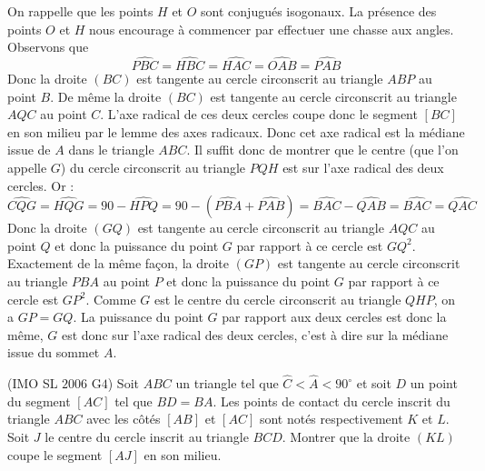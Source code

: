 \begin{sol}
On rappelle que les points $H$ et $O$ sont conjugués isogonaux. La présence des points $O$ et $H$ nous encourage à commencer par effectuer une chasse aux angles. Observons que
$$\widehat{PBC}=\widehat{HBC}=\widehat{HAC}=\widehat{OAB}=\widehat{PAB}$$ Donc la droite $(BC)$ est tangente au cercle circonscrit au triangle $ABP$ au point $B$. De même la droite $(BC)$ est tangente au cercle circonscrit au triangle $AQC$ au point $C$. L'axe radical de ces deux cercles coupe donc le segment $[BC]$ en son milieu par le lemme des axes radicaux. Donc cet axe radical est la médiane issue de $A$ dans le triangle $ABC$. Il suffit donc de montrer que le centre (que l'on appelle $G$) du cercle circonscrit au triangle $PQH$ est sur l'axe radical des deux cercles. Or :
$$\widehat{CQG}=\widehat{HQG}=90-\widehat{HPQ}=90-(\widehat{PBA}+\widehat{PAB})=\widehat{BAC}-\widehat{QAB}=\widehat{BAC}=\widehat{QAC}$$
Donc la droite $(GQ)$ est tangente au cercle circonscrit au triangle $AQC$ au point $Q$ et donc la puissance du point $G$ par rapport à ce cercle est $GQ^2$. Exactement de la même façon, la droite $(GP)$ est tangente au cercle circonscrit au triangle $PBA$ au point $P$ et donc la puissance du point $G$ par rapport à ce cercle est $GP^2$. Comme $G$ est le centre du cercle circonscrit au triangle $QHP$, on a $GP=GQ$. La puissance du point $G$ par rapport aux deux cercles est donc la même, $G$ est donc sur l'axe radical des deux cercles, c'est à dire sur la médiane issue du sommet $A$.
\end{sol}


\begin{exo}
(IMO SL $2006$ G$4$)
Soit $ABC$ un triangle tel que $\widehat{C}<\widehat{A}<90^\circ$ et soit $D$ un point du segment $[AC]$ tel que $BD=BA$. Les points de contact du cercle inscrit du triangle $ABC$ avec les côtés $[AB]$ et $[AC]$ sont notés respectivement $K$ et $L$. Soit $J$ le centre du cercle inscrit au triangle $BCD$. Montrer que la droite $(KL)$ coupe le segment $[AJ]$ en son milieu.
\end{exo}


